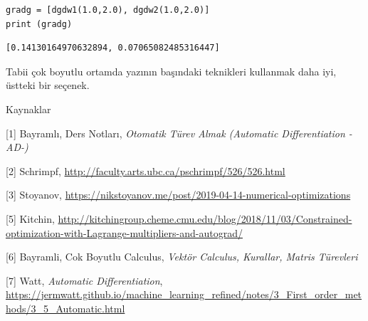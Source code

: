 \documentclass[12pt,fleqn]{article}\usepackage{../../common}
\begin{document}
\begin{verbatim}
gradg = [dgdw1(1.0,2.0), dgdw2(1.0,2.0)]
print (gradg)
\end{verbatim}

\begin{verbatim}
[0.14130164970632894, 0.07065082485316447]
\end{verbatim}

Tabii çok boyutlu ortamda yazının başındaki teknikleri kullanmak daha iyi,
üstteki bir seçenek.

Kaynaklar 

[1] Bayramlı, Ders Notları, {\em Otomatik Türev Almak (Automatic Differentiation -AD-)}

[2] Schrimpf, \url{http://faculty.arts.ubc.ca/pschrimpf/526/526.html}

[3] Stoyanov, \url{https://nikstoyanov.me/post/2019-04-14-numerical-optimizations}

[5] Kitchin, \url{http://kitchingroup.cheme.cmu.edu/blog/2018/11/03/Constrained-optimization-with-Lagrange-multipliers-and-autograd/}

[6] Bayramli, Cok Boyutlu Calculus, {\em Vektör Calculus, Kurallar, Matris Türevleri}

[7] Watt, {\em Automatic Differentiation}, 
    \url{https://jermwatt.github.io/machine_learning_refined/notes/3_First_order_methods/3_5_Automatic.html}
\end{document}
